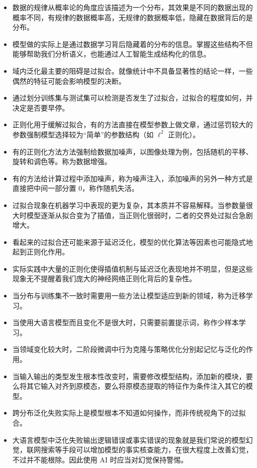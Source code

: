 \begin{itemize}
    \item 数据的规律从概率论的角度应该描述为一个分布，其效果是不同的数据出现的概率不同，有规律的数据概率高，无规律的数据概率低，隐藏在数据背后的是分布。
    \item 模型做的实际上是通过数据学习背后隐藏着的分布的信息。掌握这些结构不但能够帮助我们分析语义，也能通过人工智能生成结构化的信息。
    \item 域内泛化最主要的阻碍是过拟合。就像统计中不具备显著性的结论一样，一些偶然的特征可能会影响模型的决断。
    \item 通过划分训练集与测试集可以检测是否发生了过拟合，过拟合的程度如何，并决定是否要早停。
    \item 正则化用于缓解过拟合，有的方法直接在模型参数上做文章，通过惩罚较大的参数强制模型选择较为“简单”的参数结构（如 $\ell^2$ 正则化）。
    \item 有的正则化方法方法强制给数据加噪声，以图像处理为例，包括随机的平移、旋转和调色等。称为数据增强。
    \item 有的方法给计算过程中添加噪声，称为噪声注入，添加噪声的另外一种方式是直接把中间一部分置 0，称作随机失活。
    \item 过拟合现象在机器学习中表现的更为复杂，其本质并不容易解释。当参数量很大时模型逐渐从拟合变为了插值，当正则化很弱时，二者的交界处过拟合急剧增大。
    \item 看起来的过拟合还可能来源于延迟泛化，模型的优化算法等因素也可能隐式地起到正则化作用。
    \item 实际实践中大量的正则化使得插值机制与延迟泛化表现地并不明显，但是这些现象无不提醒着我们庞大的神经网络正则化背后的复杂性。
    \item 当分布与训练集不一致时需要用一些方法让模型适应到新的领域，称为迁移学习。
    \item 当使用大语言模型而且变化不是很大时，只需要前置提示词，称作少样本学习。
    \item 当领域变化较大时，二阶段微调中行为克隆与策略优化分别起记忆与泛化的作用。
    \item 当输入输出的类型发生根本性改变时，需要修改模型结构，添加新的模块，要么将其它输入对齐到原模态，要么将原模态提取的特征作为条件注入其它的模型。
    \item 跨分布泛化失败实际上是模型根本不知道如何操作，而非传统视角下的过拟合。
    \item 大语言模型中泛化失败输出逻辑错误或事实错误的现象就是我们常说的模型幻觉，联网搜索等手段可以增加模型的事实核查能力，在很大程度上改善幻觉，不过并不能根除。因此使用 AI 时应当对幻觉保持警惕。
\end{itemize}

